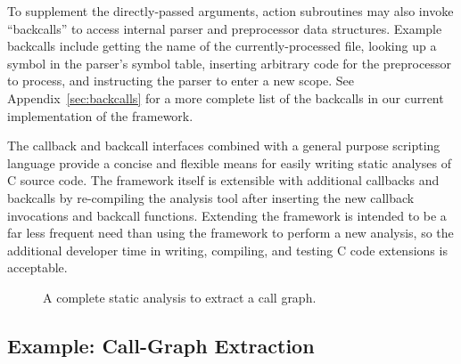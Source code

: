 \documentclass{article}
\newcommand{\C}{\mbox{C}}
\begin{document}
To supplement the directly-passed arguments, action subroutines may also invoke
``backcalls'' to access internal
parser and preprocessor data structures. Example backcalls include
getting the name of the currently-processed file, looking up a symbol in
the parser's symbol table, inserting arbitrary code for the preprocessor
to process, and instructing the parser to enter a new scope. 
See Appendix~\ref{sec:backcalls} for a more complete list of
the backcalls in our current implementation of the framework.

The callback and backcall interfaces combined with a general
purpose scripting language provide a concise and flexible means for
easily writing static analyses of \C{} source code.  The framework
itself is extensible with additional callbacks and backcalls by
re-compiling the analysis tool after inserting the new callback
invocations and backcall functions.  Extending the framework is intended 
to be a far less frequent need than using the framework to perform a new 
analysis, so the additional developer time in writing, compiling, and
testing C code extensions is acceptable.


\begin{figure}[t]
\begin{center}
\begin{small}
\end{small}
\caption{A complete static analysis to extract a call graph.}
\label{fig:call_graph_extractor}
\end{center}
\end{figure}

\subsection{Example: Call-Graph Extraction}
\label{sec:call_graph_extraction}
\end{document}
